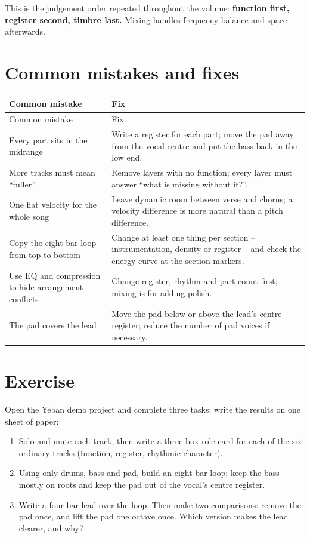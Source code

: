 This is the judgement order repeated throughout the volume: \textbf{function first, register second, timbre last.} Mixing handles frequency balance and space afterwards.

\section{Common mistakes and fixes}
\label{sec:overview-mistakes}

\begin{longtable}{p{}p{}}
\toprule
Common mistake & Fix \\
\midrule
\endfirsthead
\toprule
Common mistake & Fix \\
\midrule
\endhead
Every part sits in the midrange & Write a register for each part; move the pad away from the vocal centre and put the bass back in the low end. \\
More tracks must mean ``fuller'' & Remove layers with no function; every layer must answer ``what is missing without it?''. \\
One flat velocity for the whole song & Leave dynamic room between verse and chorus; a velocity difference is more natural than a pitch difference. \\
Copy the eight-bar loop from top to bottom & Change at least one thing per section -- instrumentation, density or register -- and check the energy curve at the section markers. \\
Use EQ and compression to hide arrangement conflicts & Change register, rhythm and part count first; mixing is for adding polish. \\
The pad covers the lead & Move the pad below or above the lead's centre register; reduce the number of pad voices if necessary. \\
\bottomrule
\end{longtable}

\section{Exercise}
\label{sec:overview-exercise}

\begin{exercise}
Open the Yeban demo project and complete three tasks; write the results on one sheet of paper:
\begin{enumerate}
\item Solo and mute each track, then write a three-box role card for each of the six ordinary tracks (function, register, rhythmic character).
\item Using only drums, bass and pad, build an eight-bar loop; keep the bass mostly on roots and keep the pad out of the vocal's centre register.
\item Write a four-bar lead over the loop. Then make two comparisons: remove the pad once, and lift the pad one octave once. Which version makes the lead clearer, and why?
\end{enumerate}
\end{exercise}

